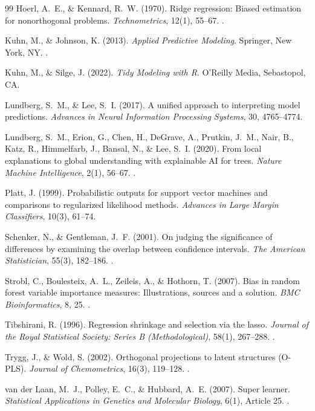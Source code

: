 \documentclass[11pt,oneside]{book}
\begin{document}
\begin{thebibliography}{99}
Hoerl, A.~E., \& Kennard, R.~W. (1970). Ridge regression: Biased estimation for nonorthogonal problems. \textit{Technometrics}, 12(1), 55--67. .

Kuhn, M., \& Johnson, K. (2013). \textit{Applied Predictive Modeling}. Springer, New York, NY. .

Kuhn, M., \& Silge, J. (2022). \textit{Tidy Modeling with R}. O'Reilly Media, Sebastopol, CA.

Lundberg, S.~M., \& Lee, S.~I. (2017). A unified approach to interpreting model predictions. \textit{Advances in Neural Information Processing Systems}, 30, 4765--4774.

Lundberg, S.~M., Erion, G., Chen, H., DeGrave, A., Prutkin, J.~M., Nair, B., Katz, R., Himmelfarb, J., Bansal, N., \& Lee, S.~I. (2020). From local explanations to global understanding with explainable AI for trees. \textit{Nature Machine Intelligence}, 2(1), 56--67. .

Platt, J. (1999). Probabilistic outputs for support vector machines and comparisons to regularized likelihood methods. \textit{Advances in Large Margin Classifiers}, 10(3), 61--74.

Schenker, N., \& Gentleman, J.~F. (2001). On judging the significance of differences by examining the overlap between confidence intervals. \textit{The American Statistician}, 55(3), 182--186. .

Strobl, C., Boulesteix, A.~L., Zeileis, A., \& Hothorn, T. (2007). Bias in random forest variable importance measures: Illustrations, sources and a solution. \textit{BMC Bioinformatics}, 8, 25. .

Tibshirani, R. (1996). Regression shrinkage and selection via the lasso. \textit{Journal of the Royal Statistical Society: Series B (Methodological)}, 58(1), 267--288. .

Trygg, J., \& Wold, S. (2002). Orthogonal projections to latent structures (O-PLS). \textit{Journal of Chemometrics}, 16(3), 119--128. .

van der Laan, M.~J., Polley, E.~C., \& Hubbard, A.~E. (2007). Super learner. \textit{Statistical Applications in Genetics and Molecular Biology}, 6(1), Article 25. .


\end{thebibliography}
\end{document}
